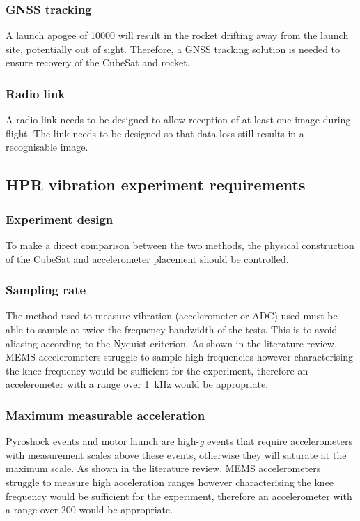 \documentclass[draft]{report}
\begin{document}
\subsubsection{GNSS tracking}
A launch apogee of \SI{10000}{\feet} will result in the rocket drifting away from the launch site, potentially out of sight. Therefore, a GNSS tracking solution is needed to ensure recovery of the CubeSat and rocket.

\subsubsection{Radio link}
A radio link needs to be designed to allow reception of at least one image during flight. The link needs to be designed so that data loss still results in a recognisable image.

\subsection{HPR vibration experiment requirements}

\subsubsection{Experiment design} To make a direct comparison between the two methods, the physical construction of the CubeSat and accelerometer placement should be controlled.

\subsubsection{Sampling rate} The method used to measure vibration (accelerometer or ADC) used must be able to sample at twice the frequency bandwidth of the tests. This is to avoid aliasing according to the Nyquist criterion. As shown in the literature review, MEMS accelerometers struggle to sample high frequencies however characterising the knee frequency would be sufficient for the experiment, therefore an accelerometer with a range over \SI{1}{\kilo\hertz} would be appropriate.

\subsubsection{Maximum measurable acceleration} Pyroshock events and motor launch are high-\textit{g} events that require accelerometers with measurement scales above these events, otherwise they will saturate at the maximum scale.
As shown in the literature review, MEMS accelerometers struggle to measure high acceleration ranges however characterising the knee frequency would be sufficient for the experiment, therefore an accelerometer with a range over \SI{200}{\gacc} would be appropriate.
\end{document}
